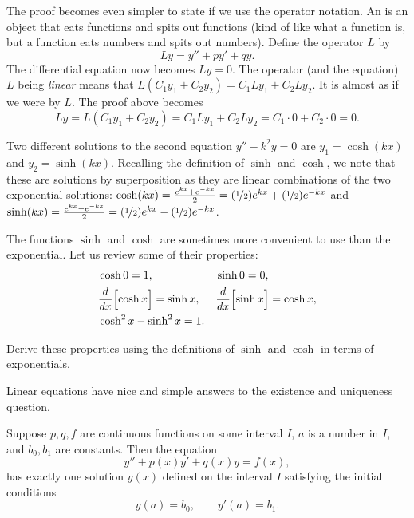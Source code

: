 The proof becomes even simpler to state if we use the
operator notation.
An \emph{} is an object that eats functions and spits out functions (kind of
like what a function is, but a function eats numbers and spits out numbers).
Define the operator $L$ by
\begin{equation*}
Ly = y'' + py' + qy .
\end{equation*}
The differential equation now becomes $Ly=0$.
The operator (and the equation)
$L$ being \emph{linear} means that $L(C_1y_1 + C_2y_2) = 
C_1 Ly_1 + C_2 Ly_2$.  It is almost as if we were  by $L$.  The proof above becomes
\begin{equation*}
Ly = L(C_1y_1 + C_2y_2) = 
C_1 Ly_1 + C_2 Ly_2 = C_1 \cdot 0 + C_2 \cdot 0 = 0 .
\end{equation*}

\medskip

Two different solutions to the second equation $y'' - k^2y = 0$ are
$y_1 = \cosh (kx)$ and $y_2 = \sinh (kx)$.
Recalling the definition of $\sinh$ and $\cosh$,
we note that these are solutions by
superposition as they
are linear combinations of the two
exponential solutions:
$\cosh(kx) = \frac{e^{kx}  + e^{-kx}}{2} = (\nicefrac{1}{2}) e^{kx}  +
(\nicefrac{1}{2}) e^{-kx}$ and
$\sinh(kx) = \frac{e^{kx} - e^{-kx}}{2} = (\nicefrac{1}{2}) e^{kx}  -
(\nicefrac{1}{2}) e^{-kx}$.

The functions $\sinh$ and $\cosh$ are sometimes more convenient to use than the
exponential.  Let us review some of their properties:
\begin{align*}
& \cosh 0  = 1 , &   & \sinh 0 = 0 , \\
& \frac{d}{dx} \Bigl[ \cosh x \Bigr] = \sinh x , &  & \frac{d}{dx} \Bigl[ \sinh x \Bigr] = \cosh x , \\
& \cosh^2 x - \sinh^2 x = 1 .
\end{align*}


\begin{exercise}
Derive these properties using the definitions of $\sinh$
and $\cosh$ in terms of exponentials.
\end{exercise}


Linear equations have nice and simple
answers to the existence and uniqueness question.

\begin{theorem}
Suppose $p, q, f$ are continuous functions on some interval
$I$, $a$ is a number in $I$,
and $b_0, b_1$ are constants.
Then the equation
\begin{equation*}
y'' + p(x) y' + q(x) y = f(x) ,
\end{equation*}
has exactly one solution $y(x)$ defined on the interval $I$ satisfying the initial conditions
\begin{equation*}
y(a) = b_0 , \qquad y'(a) = b_1 .
\end{equation*}
\end{theorem}

